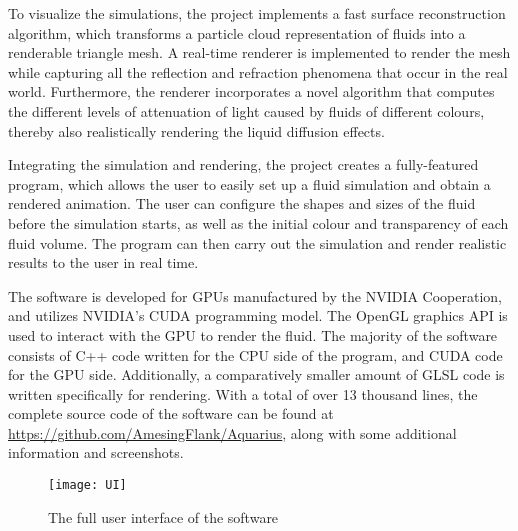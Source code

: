 To visualize the simulations, the project implements a fast surface reconstruction algorithm, which transforms a particle cloud representation of fluids into a renderable triangle mesh. A real-time renderer is implemented to render the mesh while capturing all the reflection and refraction phenomena that occur in the real world. Furthermore, the renderer incorporates a novel algorithm that computes the different levels of attenuation of light caused by fluids of different colours, thereby also realistically rendering the liquid diffusion effects. 

Integrating the simulation and rendering, the project creates a fully-featured program, which allows the user to easily set up a fluid simulation and obtain a rendered animation. The user can configure the shapes and sizes of the fluid before the simulation starts, as well as the initial colour and transparency of each fluid volume. The program can then carry out the simulation and render realistic results to the user in real time. 

The software is developed for GPUs manufactured by the NVIDIA Cooperation, and utilizes NVIDIA's CUDA programming model. The OpenGL graphics API is used to interact with the GPU to render the fluid. The majority of the software consists of C++ code written for the CPU side of the program, and CUDA code for the GPU side. Additionally, a comparatively smaller amount of GLSL code is written specifically for rendering. With a total of over 13 thousand lines, the complete source code of the software can be found at \url{https://github.com/AmesingFlank/Aquarius}, along with some additional information and screenshots.

\begin{figure}[H]
    \centering
        \texttt{[image: UI]}
    \caption{The full user interface of the software}
    \label{figure UI demo}
\end{figure}